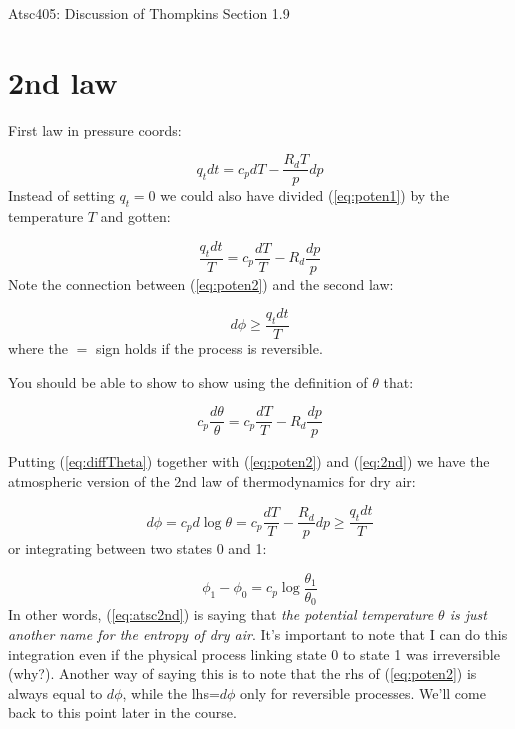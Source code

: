 \documentclass[12pt]{article}
\begin{document}
\pagestyle{first}

\begin{center}
Atsc405: Discussion of Thompkins Section 1.9\\
\end{center}


\section{2nd law}
\label{sec:2nd-law-continued}

First law in pressure coords:

\begin{equation}
  \label{eq:poten1}
  q_t dt = c_p dT - \frac{R_d T}{p} dp
\end{equation}
Instead of
setting $q_t=0$ we could also have divided (\ref{eq:poten1}) by the
temperature $T$ and gotten:

\begin{equation}
  \label{eq:poten2}
  \frac{q_t dt}{T} = c_p \frac{dT}{T} - R_d \frac{dp }{p}
\end{equation}
Note the connection between (\ref{eq:poten2}) and the second law:

\begin{equation}
  \label{eq:2nd}
  d\phi \geq \frac{q_t dt}{T}
\end{equation}
where the $=$ sign holds if the process is reversible.

You should be able to show to show using the definition of $\theta$
that:

\begin{equation}
  \label{eq:diffTheta}
  c_p \frac{d\theta}{\theta} = c_p \frac{dT}{T} - R_d \frac{ dp }{p}
\end{equation}

Putting (\ref{eq:diffTheta}) together with (\ref{eq:poten2}) and (\ref{eq:2nd})
we have the atmospheric version of the 2nd law of thermodynamics for dry air:

\begin{equation}
  \label{eq:atsc2nd}
d\phi=  c_p d \log\theta = c_p \frac{dT}{T} - \frac{R_d }{p} dp \geq \frac{q_t dt}{T}
\end{equation}
or integrating between two states 0 and 1:

\begin{equation}
  \label{eq:atsc3rd}
\phi_1 - \phi_0=  c_p  \log \frac{\theta_1}{\theta_0}
\end{equation}
In other words, (\ref{eq:atsc2nd}) is saying that \textit{the potential temperature 
$\theta$ is just another name for the entropy of dry air}.  It's important to note that
I can do this integration even if the physical process linking state 0 to state 1
was irreversible (why?). Another way of saying this is to note that the rhs of (\ref{eq:poten2}) is always
equal to $d\phi$, while the lhs=$d\phi$ only for reversible processes.  We'll come
back to this point later in the course.
\end{document}
